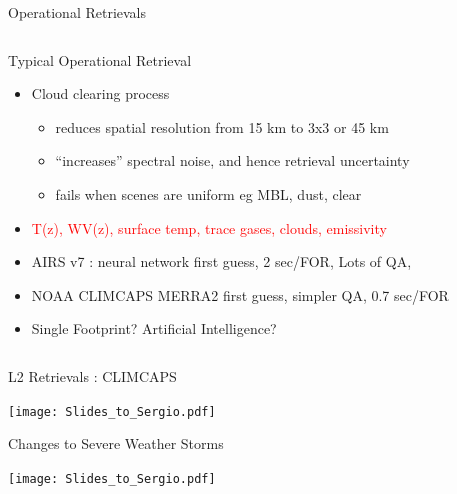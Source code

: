 \documentclass[10pt,t]{beamer}
\begin{document}
\begin{frame}[shrink=2]{Operational Retrievals}
\begin{columns}
\begin{column}{0.55\columnwidth}
\begin{block}{Typical Operational Retrieval}
  \begin{itemize}
    \item Cloud clearing process 
       \begin{itemize}
          \item reduces spatial resolution from 15 km to 3x3 or 45 km
          \item ``increases'' spectral noise, and hence retrieval uncertainty
          \item fails when scenes are uniform eg MBL, dust, clear
       \end{itemize}
    \item \textcolor{red}{T(z), WV(z), surface temp, trace gases, clouds, emissivity}
    \item AIRS v7 : neural network first guess, 2 sec/FOR, Lots of QA, 
    \item NOAA CLIMCAPS MERRA2 first guess, simpler QA, 0.7 sec/FOR
    \item Single Footprint? Artificial Intelligence?
  \end{itemize}
\end{block}
\end{column}
\end{columns}
\end{frame}
\begin{frame}{L2 Retrievals : CLIMCAPS}
\vspace{-0.35in}
\begin{center}
\texttt{[image: Slides\_to\_Sergio.pdf]}
\end{center}
\end{frame}
\begin{frame}{Changes to Severe Weather Storms}
\vspace{-0.35in}
\begin{center}
\texttt{[image: Slides\_to\_Sergio.pdf]}
\end{center}
\end{frame}
\end{document}
